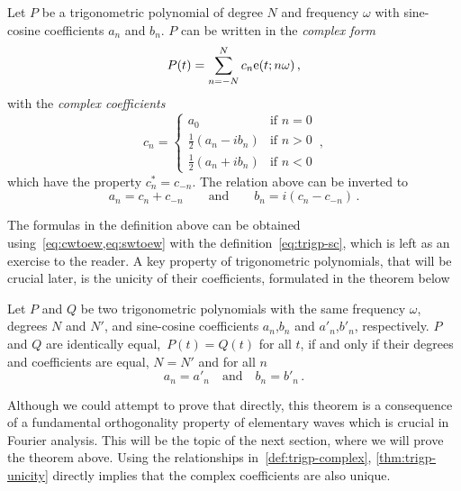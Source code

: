 \begin{definition}
  \label{def:trigp-complex}
  Let $P$ be a trigonometric polynomial of degree $N$ and frequency $\omega$ with
  sine-cosine coefficients $a_n$ and $b_n$. $P$ can be written in the \emph{complex form}
  \begin{equation}
    P(t)=\sum_{n=-N}^{N}c_n\mathrm{e}(t;n\omega)\,,\label{eq:trigp-complex}
  \end{equation}
  with the \emph{complex coefficients}
  \begin{equation}
    c_n =
    \begin{cases}
      a_0 &\text{if~}n=0\\
      \frac{1}{2}(a_n-ib_n)&\text{if~}n>0\\
      \frac{1}{2}(a_n+ib_n)&\text{if~}n<0
    \end{cases}
    \,,\label{eq:ab-to-c}
  \end{equation}
  which have the property $c_n^*=c_{-n}$. The relation above can be inverted
  to
  \begin{equation}
    a_n=c_n+c_{-n}\qquad\text{and}\qquad
    b_n=i(c_n-c_{-n})\,.
  \end{equation}
\end{definition}
The formulas in the definition above can be obtained using~\cref{eq:cwtoew,eq:swtoew} with the definition~\cref{eq:trigp-sc}, which is left as an exercise to the reader. A key property of trigonometric polynomials, that will be crucial later, is the unicity of their coefficients, formulated in the theorem below
\begin{theorem}
  \label{thm:trigp-unicity}
  Let $P$ and $Q$ be two trigonometric polynomials with the same frequency $\omega$, degrees $N$ and $N'$, and sine-cosine coefficients $a_n$,$b_n$ and $a'_n$,$b'_n$, respectively. $P$ and $Q$ are identically equal,~\ie $P(t)=Q(t)$ for all $t$, if and only if their degrees and coefficients are equal, \ie $N=N'$ and for all $n$
  \begin{equation}
    a_n=a'_n\quad\text{and}\quad b_n=b'_n\,.
  \end{equation}
\end{theorem}
Although we could attempt to prove that directly, this theorem is a consequence of a fundamental
orthogonality property of elementary waves which is crucial in Fourier analysis. This will be the topic of
the next section, where we will prove the theorem above. Using the relationships in~\cref{def:trigp-complex}, \cref{thm:trigp-unicity} directly implies that the complex coefficients are also unique.

